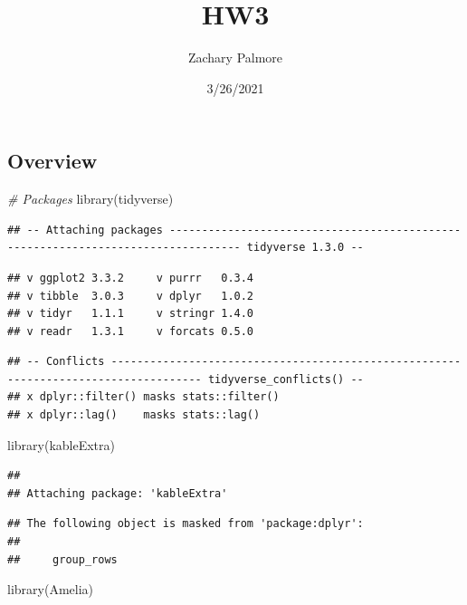 \documentclass[
]{article}
\title{HW3}
\author{Zachary Palmore}
\date{3/26/2021}
\newenvironment{Shaded}{\begin{snugshade}}{\end{snugshade}}
\newcommand{\CommentTok}[1]{\textcolor[rgb]{0.56,0.35,0.01}{\textit{#1}}}
\newcommand{\FunctionTok}[1]{\textcolor[rgb]{0.00,0.00,0.00}{#1}}
\newcommand{\NormalTok}[1]{#1}
\begin{document}
\maketitle

\hypertarget{overview}{%
\subsection{Overview}\label{overview}}

\begin{Shaded}
\begin{Highlighting}[]
\CommentTok{\# Packages}
\FunctionTok{library}\NormalTok{(tidyverse)}
\end{Highlighting}
\end{Shaded}

\begin{verbatim}
## -- Attaching packages --------------------------------------------------------------------------------- tidyverse 1.3.0 --
\end{verbatim}

\begin{verbatim}
## v ggplot2 3.3.2     v purrr   0.3.4
## v tibble  3.0.3     v dplyr   1.0.2
## v tidyr   1.1.1     v stringr 1.4.0
## v readr   1.3.1     v forcats 0.5.0
\end{verbatim}

\begin{verbatim}
## -- Conflicts ------------------------------------------------------------------------------------ tidyverse_conflicts() --
## x dplyr::filter() masks stats::filter()
## x dplyr::lag()    masks stats::lag()
\end{verbatim}

\begin{Shaded}
\begin{Highlighting}[]
\FunctionTok{library}\NormalTok{(kableExtra)}
\end{Highlighting}
\end{Shaded}

\begin{verbatim}
## 
## Attaching package: 'kableExtra'
\end{verbatim}

\begin{verbatim}
## The following object is masked from 'package:dplyr':
## 
##     group_rows
\end{verbatim}

\begin{Shaded}
\begin{Highlighting}[]
\FunctionTok{library}\NormalTok{(Amelia)}
\end{Highlighting}
\end{Shaded}
\end{document}
